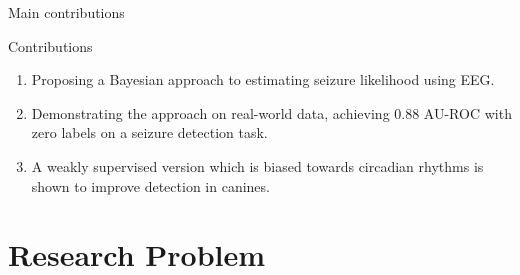 \documentclass[t]{beamer}
\theoremstyle{definition}
\begin{document}
\begin{frame}{Main contributions}
    \begin{block}{Contributions}
        \begin{enumerate}[<+-|alert@+>]
            \item Proposing a Bayesian approach to estimating seizure likelihood using EEG.
                \item Demonstrating the approach on real-world data, achieving 0.88 AU-ROC with zero labels on a seizure detection task.
                \item A weakly supervised version which is biased towards circadian rhythms is shown to improve detection in canines.
        \end{enumerate}
    \end{block}
\end{frame}


\section{Research Problem}
\end{document}
